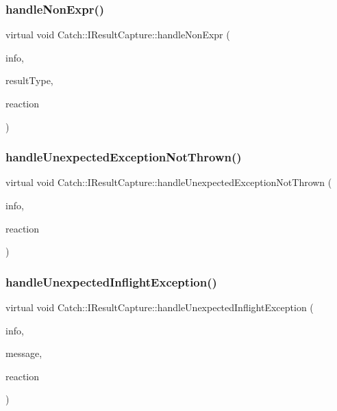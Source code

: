\mbox{\label{struct_catch_1_1_i_result_capture_ab7dbdf8aa28427119583e24dbb302c63}} 
\subsubsection{handleNonExpr()}
{\footnotesize\ttfamily virtual void Catch\+::\+I\+Result\+Capture\+::handle\+Non\+Expr (\begin{DoxyParamCaption}\item[{\textbf{ Assertion\+Info} const \&}]{info,  }\item[{\textbf{ Result\+Was\+::\+Of\+Type}}]{result\+Type,  }\item[{\textbf{ Assertion\+Reaction} \&}]{reaction }\end{DoxyParamCaption})\hspace{0.3cm}{\ttfamily [pure virtual]}}

\mbox{\label{struct_catch_1_1_i_result_capture_a6382ed20486e2d9a020da971c6d5c53d}} 
\subsubsection{handleUnexpectedExceptionNotThrown()}
{\footnotesize\ttfamily virtual void Catch\+::\+I\+Result\+Capture\+::handle\+Unexpected\+Exception\+Not\+Thrown (\begin{DoxyParamCaption}\item[{\textbf{ Assertion\+Info} const \&}]{info,  }\item[{\textbf{ Assertion\+Reaction} \&}]{reaction }\end{DoxyParamCaption})\hspace{0.3cm}{\ttfamily [pure virtual]}}

\mbox{\label{struct_catch_1_1_i_result_capture_afc97bc69829185222f955ebeef97adfe}} 
\subsubsection{handleUnexpectedInflightException()}
{\footnotesize\ttfamily virtual void Catch\+::\+I\+Result\+Capture\+::handle\+Unexpected\+Inflight\+Exception (\begin{DoxyParamCaption}\item[{\textbf{ Assertion\+Info} const \&}]{info,  }\item[{std\+::string const \&}]{message,  }\item[{\textbf{ Assertion\+Reaction} \&}]{reaction }\end{DoxyParamCaption})\hspace{0.3cm}{\ttfamily [pure virtual]}}

